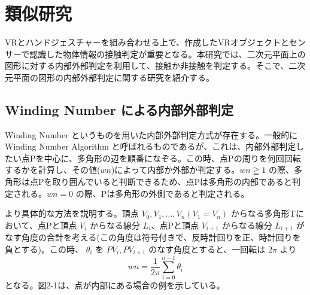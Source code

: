 \section{類似研究}
VRとハンドジェスチャーを組み合わせる上で、作成したVRオブジェクトとセンサーで認識した物体情報の接触判定が重要となる。本研究では、二次元平面上の図形に対する内部外部判定を利用して、接触か非接触を判定する。そこで、二次元平面の図形の内部外部判定に関する研究を紹介する。




\subsection{Winding Number による内部外部判定\cite{タグ3}}
Winding Number というものを用いた内部外部判定方式が存在する。一般的に Winding Number Algorithm と呼ばれるものであるが、これは、内部外部判定したい点Pを中心に、多角形の辺を順番になぞる。この時、点Pの周りを何回回転するかを計算し、その値($wn$)によって内部か外部か判定する。$wn \geqq 1$ の際、多角形は点Pを取り囲んでいると判断できるため、点Pは多角形の内部であると判定される。$wn = 0$ の際、Pは多角形の外側であると判定される。

より具体的な方法を説明する。頂点 $V_0, V_1, \ldots, V_n (V_1 = V_n)$ からなる多角形Tにおいて、点Pと頂点 $V_i$ からなる線分 $L_i$、点Pと頂点 $V_{i+1}$ からなる線分 $L_{i+1}$ がなす角度の合計を考える(この角度は符号付きで、反時計回りを正、時計回りを負とする)。この時、 $\theta_i$ を $PV_i, PV_{i+1}$ のなす角度とすると、一回転は $2\pi$ より
\[
wn = \frac{1}{2\pi}\sum_{i=0}^{n-1}\theta_i
\]
となる。図2-1は、点が内部にある場合の例を示している。


